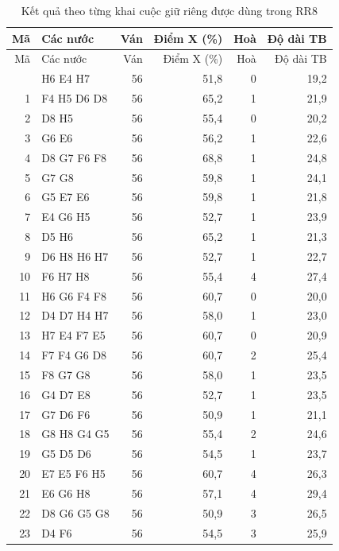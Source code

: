 \par{\footnotesize
\renewcommand{\arraystretch}{0.95}
\begin{longtable}{rlrrrr}
  \caption{Kết quả theo từng khai cuộc giữ riêng được dùng trong RR8}\label{tab:cs-tk-khaicuoc}\\
    \toprule
    Mã & Các nước & Ván & Điểm X (\%) & Hoà & Độ dài TB \\
    \midrule
  \endfirsthead
    \toprule
    Mã & Các nước & Ván & Điểm X (\%) & Hoà & Độ dài TB \\
    \midrule
  \endhead
    \bottomrule
  \endfoot
    0 & H6 E4 H7 & 56 & 51,8 & 0 & 19,2 \\
    1 & F4 H5 D6 D8 & 56 & 65,2 & 1 & 21,9 \\
    2 & D8 H5 & 56 & 55,4 & 0 & 20,2 \\
    3 & G6 E6 & 56 & 56,2 & 1 & 22,6 \\
    4 & D8 G7 F6 F8 & 56 & 68,8 & 1 & 24,8 \\
    5 & G7 G8 & 56 & 59,8 & 1 & 24,1 \\
    6 & G5 E7 E6 & 56 & 59,8 & 1 & 21,8 \\
    7 & E4 G6 H5 & 56 & 52,7 & 1 & 23,9 \\
    8 & D5 H6 & 56 & 65,2 & 1 & 21,3 \\
    9 & D6 H8 H6 H7 & 56 & 52,7 & 1 & 22,7 \\
    10 & F6 H7 H8 & 56 & 55,4 & 4 & 27,4 \\
    11 & H6 G6 F4 F8 & 56 & 60,7 & 0 & 20,0 \\
    12 & D4 D7 H4 H7 & 56 & 58,0 & 1 & 23,0 \\
    13 & H7 E4 F7 E5 & 56 & 60,7 & 0 & 20,9 \\
    14 & F7 F4 G6 D8 & 56 & 60,7 & 2 & 25,4 \\
    15 & F8 G7 G8 & 56 & 58,0 & 1 & 23,5 \\
    16 & G4 D7 E8 & 56 & 52,7 & 1 & 23,5 \\
    17 & G7 D6 F6 & 56 & 50,9 & 1 & 21,1 \\
    18 & G8 H8 G4 G5 & 56 & 55,4 & 2 & 24,6 \\
    19 & G5 D5 D6 & 56 & 54,5 & 1 & 23,7 \\
    20 & E7 E5 F6 H5 & 56 & 60,7 & 4 & 26,3 \\
    21 & E6 G6 H8 & 56 & 57,1 & 4 & 29,4 \\
    22 & D8 G6 G5 G8 & 56 & 50,9 & 3 & 26,5 \\
    23 & D4 F6 & 56 & 54,5 & 3 & 25,9 \\

\end{longtable}}
